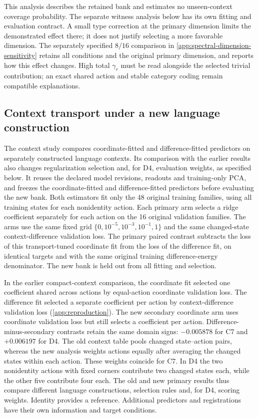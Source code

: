 This analysis describes the retained bank and estimates no unseen-context coverage probability. The separate witness analysis below has its own fitting and evaluation contract. A small type correction at the primary dimension limits the demonstrated effect there; it does not justify selecting a more favorable dimension. The separately specified $8/16$ comparison in \cref{app:spectral-dimension-sensitivity} retains all conditions and the original primary dimension, and reports how this effect changes. High total $\gamma_r$ must be read alongside the selected trivial contribution; an exact shared action and stable category coding remain compatible explanations.

\subsection{Context transport under a new language construction}
The context study compares coordinate-fitted and difference-fitted predictors on separately constructed language contexts. Its comparison with the earlier results also changes regularization selection and, for D4, evaluation weights, as specified below. It reuses the declared model revisions, readouts and training-only PCA, and freezes the coordinate-fitted and difference-fitted predictors before evaluating the new bank. Both estimators fit only the 48 original training families, using all training states for each nonidentity action. Each primary arm selects a ridge coefficient separately for each action on the 16 original validation families. The arms use the same fixed grid $\{0,10^{-5},10^{-3},10^{-1},1\}$ and the same changed-state context-difference validation loss. The primary paired contrast subtracts the loss of this transport-tuned coordinate fit from the loss of the difference fit, on identical targets and with the same original training difference-energy denominator. The new bank is held out from all fitting and selection.

In the earlier compact-context comparison, the coordinate fit selected one coefficient shared across actions by equal-action coordinate validation loss. The difference fit selected a separate coefficient per action by context-difference validation loss (\cref{app:reproduction}). The new secondary coordinate arm uses coordinate validation loss but still selects a coefficient per action. Difference-minus-secondary contrasts retain the same domain signs: $-0.005878$ for C7 and $+0.006197$ for D4. The old context table pools changed state--action pairs, whereas the new analysis weights actions equally after averaging the changed states within each action. These weights coincide for C7. In D4 the two nonidentity actions with fixed corners contribute two changed states each, while the other five contribute four each. The old and new primary results thus compare different language constructions, selection rules and, for D4, scoring weights. Identity provides a reference. Additional predictors and registrations have their own information and target conditions.

